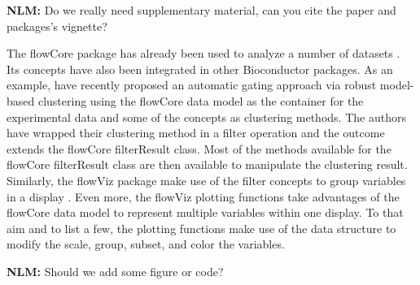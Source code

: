\documentclass[12pt]{article}
\begin{document}
{\bf NLM:} Do we really need supplementary material, can you cite the
paper and packages's vignette?

The flowCore package has already been used to analyze a number of
datasets \citep{gasparetto2004ice,brinkman2007hcf}. Its concepts have
also been integrated in other Bioconductor packages. As an example,
\cite{lo2008agf} have recently proposed an automatic gating approach
via robust model-based clustering using the flowCore data model as the
container for the experimental data and some of the concepts as
clustering methods. The authors have wrapped their clustering method
in a filter operation and the outcome extends the flowCore
filterResult class. Most of the methods available for the flowCore
filterResult class are then available to manipulate the clustering
result. Similarly, the flowViz package make use of the filter concepts
to group variables in a display \cite{sarkar2008ufv}. Even more, the
flowViz plotting functions take advantages of the flowCore data model
to represent multiple variables within one display. To that aim and to
list a few, the plotting functions make use of the data structure to
modify the scale, group, subset, and color the variables.

{\bf NLM:} Should we add some figure or code?



  
 
\end{document}
